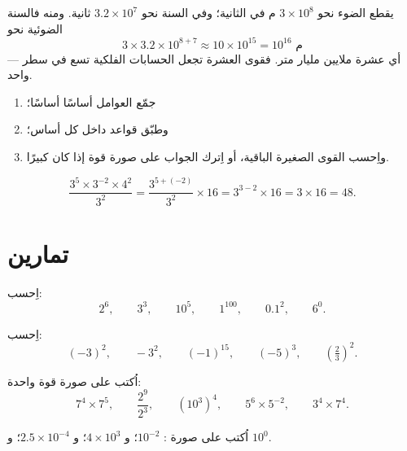 \begin{example}\label{ex:g8:powers:magnitude}
يقطع الضوء نحو $3 \times 10^8$ م في الثانية؛ وفي السنة نحو
$3.2 \times 10^7$ ثانية. ومنه فالسنة الضوئية نحو
\[
3 \times 3.2 \times 10^{8+7} \approx 10 \times 10^{15} = 10^{16}
\text{ م}
\]
--- أي عشرة ملايين مليار متر. فقوى العشرة تجعل الحسابات
الفلكية تسع في سطر واحد.
\end{example}

\begin{method}\label{met:g8:powers:simplify}
\begin{enumerate}
  \item جمّع العوامل أساسًا أساسًا؛
  \item وطبّق قواعد  داخل كل أساس؛
  \item واِحسب القوى الصغيرة الباقية، أو اِترك الجواب على صورة
        قوة إذا كان كبيرًا.
\end{enumerate}
\end{method}

\begin{example}\label{ex:g8:powers:simplify}
\[
\frac{3^5 \times 3^{-2} \times 4^2}{3^2}
= \frac{3^{5 + (-2)}}{3^2} \times 16
= 3^{3 - 2} \times 16
= 3 \times 16 = 48 .
\]
\end{example}

\section{تمارين}

\begin{exercise}[$\star$]\label{exo:g8:powers:1}
اِحسب:
\[
2^6, \qquad 3^3, \qquad 10^5, \qquad 1^{100}, \qquad 0.1^2, \qquad
6^0 .
\]
\end{exercise}

\begin{exercise}[$\star$]\label{exo:g8:powers:2}
اِحسب:
\[
(-3)^2, \qquad -3^2, \qquad (-1)^{15}, \qquad (-5)^3, \qquad
\left(\tfrac{2}{3}\right)^2 .
\]
\end{exercise}

\begin{exercise}[$\star$]\label{exo:g8:powers:3}
اُكتب على صورة قوة واحدة:
\[
7^4 \times 7^5, \qquad
\frac{2^9}{2^3}, \qquad
\left(10^3\right)^4, \qquad
5^6 \times 5^{-2}, \qquad
3^4 \times 7^4 .
\]
\end{exercise}

\begin{exercise}[$\star$]\label{exo:g8:powers:4}
اُكتب على صورة : $10^{-2}$؛ \quad و $4 \times 10^3$؛ \quad
و $2.5 \times 10^{-4}$؛ \quad و $10^0$.
\end{exercise}

